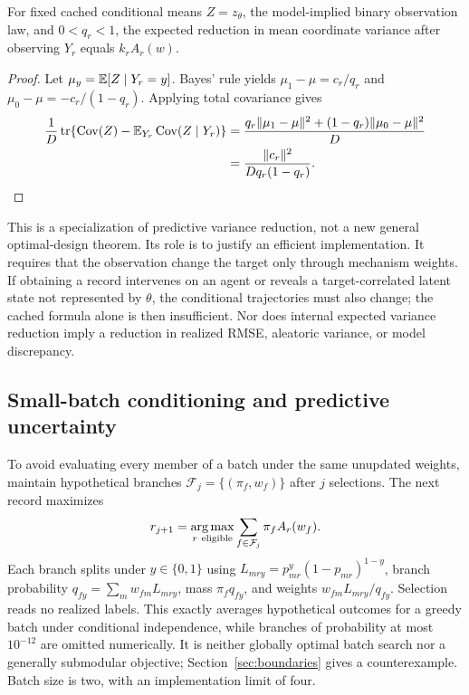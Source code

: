 \begin{proposition}
For fixed cached conditional means $Z=z_\theta$, the model-implied binary observation law, and $0<q_r<1$, the expected reduction in mean coordinate variance after observing $Y_r$ equals $k_r A_r(w)$.
\end{proposition}
\begin{proof}
Let $\mu_y=\mathbb{E}[Z\mid Y_r=y]$. Bayes' rule yields $\mu_1-\mu=c_r/q_r$ and $\mu_0-\mu=-c_r/(1-q_r)$. Applying total covariance gives
\begin{align}
 \frac1D\operatorname{tr}\{\operatorname{Cov}(Z)-\mathbb{E}_{Y_r}\operatorname{Cov}(Z\mid Y_r)\}
 &=\frac{q_r\|\mu_1-\mu\|^2+(1-q_r)\|\mu_0-\mu\|^2}{D}\nonumber\\
 &=\frac{\|c_r\|^2}{Dq_r(1-q_r)}.
\end{align}
\end{proof}
This is a specialization of predictive variance reduction, not a new general optimal-design theorem. Its role is to justify an efficient implementation. It requires that the observation change the target only through mechanism weights. If obtaining a record intervenes on an agent or reveals a target-correlated latent state not represented by $\theta$, the conditional trajectories must also change; the cached formula alone is then insufficient. Nor does internal expected variance reduction imply a reduction in realized RMSE, aleatoric variance, or model discrepancy.

\subsection{Small-batch conditioning and predictive uncertainty}
To avoid evaluating every member of a batch under the same unupdated weights, maintain hypothetical branches $\mathcal F_j=\{(\pi_f,w_f)\}$ after $j$ selections. The next record maximizes
\begin{equation}
 r_{j+1}=\argmax_{r\ \mathrm{eligible}}\sum_{f\in\mathcal F_j}\pi_f A_r(w_f).
 \label{eq:batch}
\end{equation}
Each branch splits under $y\in\{0,1\}$ using $L_{mry}=p_{mr}^y(1-p_{mr})^{1-y}$, branch probability $q_{fy}=\sum_mw_{fm}L_{mry}$, mass $\pi_fq_{fy}$, and weights $w_{fm}L_{mry}/q_{fy}$. Selection reads no realized labels. This exactly averages hypothetical outcomes for a greedy batch under conditional independence, while branches of probability at most $10^{-12}$ are omitted numerically. It is neither globally optimal batch search nor a generally submodular objective; Section~\ref{sec:boundaries} gives a counterexample. Batch size is two, with an implementation limit of four.

